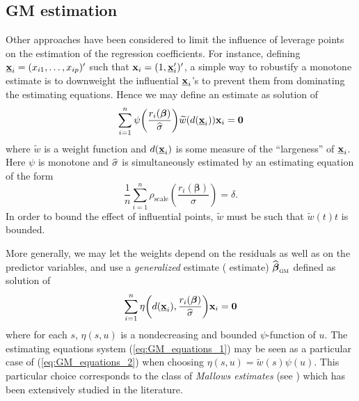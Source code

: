 \subsection{GM estimation}

Other approaches have been considered to limit the influence of leverage points
on the estimation of the regression coefficients. For instance, defining
$\underline{\mathbf x}_{i} = (x_{i1}, \ldots, x_{ip})'$ such that
$\mathbf x_{i} = (1,\underline{\mathbf x}_{i}')'$, a simple way to robustify a
monotone  estimate is to downweight the influential
$\underline{\mathbf x}_{i}$'s to prevent them from dominating the estimating
equations. Hence we may define an estimate as solution of
\begin{equation}\label{eq:GM_equations_1}
    \sum_{i=1}^{n} \psi\left(\frac{r_{i}(\boldsymbol\beta)}{\sthat{\sigma}}\right) 
    \widetilde{w}(d(\underline{\stvec{x}}_{i})) \stvec{x}_{i} = \stvec{0}
\end{equation}
where $\widetilde{w}$ is a weight function and $d(\underline{\mathbf x}_{i})$
is some measure of the “largeness” of $\underline{\mathbf x}_{i}$. Here $\psi$
is monotone and $\widehat{\sigma}$ is simultaneously estimated by an 
estimating equation of the form
\[
    \frac{1}{n}\sum_{i=1}^{n} \rho_{\mathrm{scale}}\left(\frac{r_{i}(\boldsymbol\beta)}{\sigma}\right)  = \delta.
\]
In order to bound the effect of influential points, $\widetilde{w}$ must be
such that $\widetilde{w}(t)t$ is bounded.

More generally, we may let the weights depend on the residuals as well as on
the predictor variables, and use a \emph{generalized}  estimate
( estimate) $\sthat{\boldsymbol\beta}_{\stsc{GM}}$ defined as solution
of
%
\begin{equation}\label{eq:GM_equations_2}
    \sum_{i=1}^{n}\eta\left(d(\underline{\stvec{x}}_{i}), \frac{r_{i}(\boldsymbol\beta)}{\sthat{\sigma}}\right)
    \stvec{x}_{i} = \stvec{0}
\end{equation}
%
where for each $s$, $\eta(s,u)$ is a nondecreasing and bounded $\psi$-function
of $u$. The estimating equations system (\ref{eq:GM_equations_1}) may be seen
as a particular case of (\ref{eq:GM_equations_2}) when choosing $\eta(s,u) =
\widetilde{w}(s) \psi(u)$. This particular choice corresponds to the class of
\emph{Mallows estimates} (see \citealp{Mallows:1975}) which has been
extensively studied in the literature.

